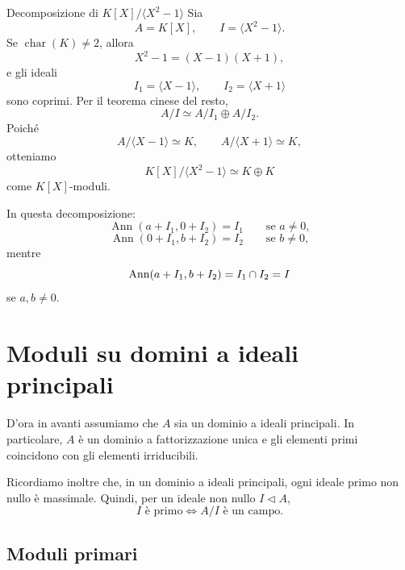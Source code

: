 \documentclass[a4paper]{article}
\begin{document}
\begin{radioactive}
\begin{snippetexample}{Decomposizione di \(K[X]/\langle X^2-1 \rangle\)}
    Sia
    \[
        A=K[X],
        \qquad
        I=\langle X^2-1 \rangle.
    \]
    Se \(\operatorname{char}(K)\neq 2\), allora
    \[
        X^2-1=(X-1)(X+1),
    \]
    e gli ideali
    \[
        I_1=\langle X-1 \rangle,
        \qquad
        I_2=\langle X+1 \rangle
    \]
    sono coprimi. Per il teorema cinese del resto,
    \[
        A/I
        \simeq
        A/I_1\oplus A/I_2.
    \]
    Poiché
    \[
        A/\langle X-1 \rangle\simeq K,
        \qquad
        A/\langle X+1 \rangle\simeq K,
    \]
    otteniamo
    \[
        K[X]/\langle X^2-1 \rangle\simeq K\oplus K
    \]
    come \(K[X]\)-moduli.

    In questa decomposizione:
    \[
        \operatorname{Ann}(a+I_1,0+I_2)=I_1
        \qquad
        \text{se } a\neq 0,
    \]
    \[
        \operatorname{Ann}(0+I_1,b+I_2)=I_2
        \qquad
        \text{se } b\neq 0,
    \]
    mentre
    \[
        \operatorname{Ann}(a+I_1,b+I_2)=I_1\cap I_2=I
    \]
    se \(a,b\neq 0\).
\end{snippetexample}
\end{radioactive}

\section{Moduli su domini a ideali principali}

\begin{radioactive}
D'ora in avanti assumiamo che \(A\) sia un dominio a ideali principali.
In particolare, \(A\) è un dominio a fattorizzazione unica e gli elementi primi coincidono con gli elementi irriducibili.

Ricordiamo inoltre che, in un dominio a ideali principali, ogni ideale primo non nullo è massimale. Quindi, per un ideale non nullo \(I\triangleleft A\),
\[
    I \text{ è primo}
    \iff
    A/I \text{ è un campo}.
\]
\end{radioactive}

\subsection{Moduli primari}
\end{document}

